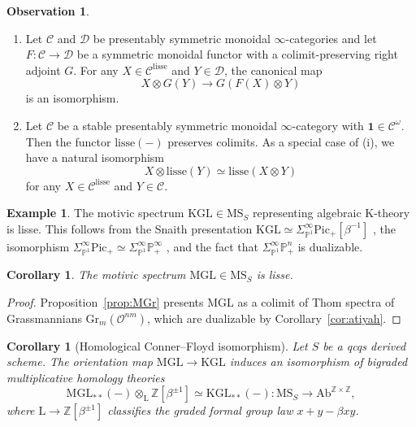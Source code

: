 \documentclass{amsart}
\numberwithin{equation}{section}
\theoremstyle{plain}
\newtheorem{corollary}[equation]{Corollary}
\theoremstyle{definition}
\newtheorem{example}[equation]{Example}
\newtheorem{observation}[equation]{Observation}
\let\scr=\mathcal
\let\bb=\mathbb
\def\Z{\bb Z}
\def\P{\bb P}
\def\1{\mathbf 1}
\def\ph{\mathord-}
\def\L{\mathrm{L}{}}
\def\Pic{\mathrm{Pic}}
\def\Gr{\mathrm{Gr}{}}
\def\MGL{\mathrm{MGL}}
\def\KGL{\mathrm{KGL}}
\def\MS{\mathrm{MS}}
\def\Ab{\mathrm{A}\mathrm{b}}
\def\lisse{\mathrm{lisse}}
\begin{document}
\begin{observation}\label{obs:lisse-proj}
	\leavevmode
	\begin{enumerate}
		\item Let $\scr C$ and $\scr D$ be presentably symmetric monoidal $\infty$-categories and let $F\colon\scr C\to\scr D$ be a symmetric monoidal functor with a colimit-preserving right adjoint $G$. For any $X\in\scr C^\lisse$ and $Y\in\scr D$, the canonical map
	\[
	X\otimes G(Y) \to G(F(X)\otimes Y)
	\]
	is an isomorphism.
	\item Let $\scr C$ be a stable presentably symmetric monoidal $\infty$-category with $\1\in\scr C^\omega$. Then the functor $\lisse(\ph)$ preserves colimits.
	As a special case of (i), we have a natural isomorphism
	 \[
	 X\otimes\lisse(Y)\simeq \lisse(X\otimes Y)
	 \]
	 for any $X\in\scr C^\lisse$ and $Y\in\scr C$.
	\end{enumerate}
\end{observation}

\begin{example}\label{ex:KGL-lisse}
	The motivic spectrum $\KGL\in\MS_S$ representing algebraic K-theory is lisse. This follows from the Snaith presentation $\KGL\simeq\Sigma^\infty_{\P^1}\Pic_+[\beta^{-1}]$ \cite[Theorem 5.3.3]{AnnalaIwasa2}, the isomorphism $\Sigma^\infty_{\P^1}\Pic_+\simeq \Sigma^\infty_{\P^1}\P^\infty_+$ \cite[Theorem 5.3]{AHI}, and the fact that $\Sigma^\infty_{\P^1}\P^n_+$ is dualizable.
\end{example}

\begin{corollary}\label{cor:MGL-lisse}
	The motivic spectrum $\MGL\in\MS_S$ is lisse.
\end{corollary}

\begin{proof}
	Proposition~\ref{prop:MGr} presents $\MGL$ as a colimit of Thom spectra of Grassmannians $\Gr_{m}(\scr O^{nm})$, which are dualizable by Corollary~\ref{cor:atiyah}.
\end{proof}

\begin{corollary}[Homological Conner–Floyd isomorphism]
	\label{cor:conner-floyd}
	Let $S$ be a qcqs derived scheme. The orientation map $\MGL\to\KGL$ induces an isomorphism of bigraded multiplicative homology theories
	\[
	\MGL_{**}(\ph)\otimes_\L\Z[\beta^{\pm 1}]\simeq \KGL_{**}(\ph)\colon \MS_S\to \Ab^{\Z\times\Z},
	\]
	where $\L\to\Z[\beta^{\pm 1}]$ classifies the graded formal group law $x+y-\beta xy$.
\end{corollary}
\end{document}
